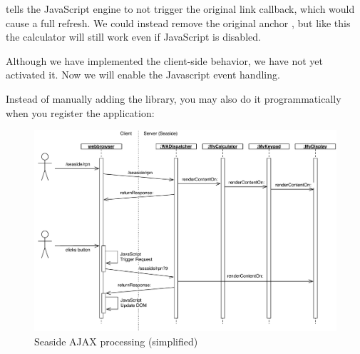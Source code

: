 \documentclass[a4paper,10pt,twoside]{book}
\begin{document}
 tells the JavaScript engine to not trigger the original link callback, which would cause a full refresh.
We could instead remove the original anchor , but like this the calculator will still work even if JavaScript is disabled.


Although we have implemented the client-side behavior, we have not yet activated it.
Now we will enable the Javascript event handling.


Instead of manually adding the library, you may also do it programmatically when you register the application:
\begin{code}{}
MyCalculator class>>>initialize
	(self registerAsApplication: 'rpn')
		addLibrary: SULibrary}}
\end{code}

\begin{figure}[ht]
\begin{center}
\includegraphics[width=\textwidth]{ajax-processing}
\caption{Seaside AJAX processing (simplified)}
\label{fig:ajax-processing}
\end{center}
\end{figure}

\end{document}
